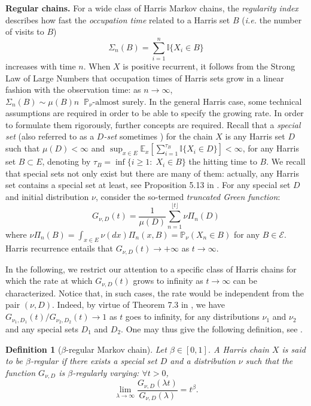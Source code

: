 \documentclass[sn-mathphys-ay]{sn-jnl}%
\newtheorem{definition}{Definition}%
\begin{document}
\noindent \textbf{Regular chains.} For a wide class of Harris Markov chains, the
\textit{regularity index} describes how fast the \textit{occupation time} related to a
Harris set $B$ (\textit{i.e.} the number of visits to $B$)
$$\Sigma_n(B)=\sum_{i=1}^n\mathbb{I}\{ X_i\in B \}$$ increases with time $n$. When $X$ is
positive recurrent, it follows from the Strong Law of Large Numbers that occupation times
of Harris sets grow in a linear fashion with the observation time: as $n\rightarrow
    \infty$, $\Sigma_n(B)\sim \mu(B)n \;\; \mathbb{P}_{\nu}\text{-almost surely}$. In the
general Harris case, some technical assumptions are required in order to be able to
specify the growing rate. In order to formulate them rigorously, further concepts are
required. Recall that a \textit{special set} (also referred to as a \textit{$D$-set}
sometimes \citep{Chen1999}) for the chain $X$ is any Harris set $D$ such that
$\mu(D)<\infty$ and $   \sup_{x\in E}\mathbb{E}_x[ \sum_{i=1}^{\tau_B}\mathbb{I}\{ X_i\in
    D \} ]<\infty$, for any Harris set $B\subset E$, denoting by $\tau_B=\inf\{i\geq 1:\;
    X_i\in B \}$ the hitting time to $B$. We recall that special sets not only exist but
there are many of them: actually, any Harris set contains a special set at least, see
Proposition 5.13 in \cite{Nummelin1984}. For any special set $D$ and initial distribution
$\nu$, consider the so-termed \textit{truncated Green function}:
\begin{equation*}
    G_{\nu,D}(t)=\frac{1}{\mu(D)}\sum_{n=1}^{\lfloor t\rfloor}\nu \Pi_n(D)
\end{equation*}
where $\nu \Pi_n(B)=\int_{x\in E}\nu(dx)\Pi_n(x,B)=\mathbb{P}_{\nu}(X_n\in B)$ for any
$B\in \mathcal{E}$. Harris recurrence entails that $G_{\nu, D}(t)\rightarrow +\infty$ as $t\rightarrow
    \infty$.

In the following, we restrict our attention to a specific class of Harris chains for
which the rate at which $G_{\nu, D}(t)$ grows to infinity as $t\rightarrow \infty$ can be
characterized. Notice that, in such cases, the rate would be independent from the pair
$(\nu, D)$. Indeed, by virtue of Theorem 7.3 in \cite{Nummelin1984}, we have $G_{\nu_1,
            D_1}(t)/G_{\nu_2, D_2}(t)\rightarrow 1$ as $t$ goes to infinity, for any distributions
$\nu_1$ and $\nu_2$ and any special sets $D_1$ and $D_2$. One may thus give the following
definition, see \cite{Chen1999,Chen2000}.

\begin{definition}[{\sc $\beta$-regular Markov chain}]\label{def:regular_chain} Let $\beta\in [0,1]$.
    A Harris chain $X$ is said to be $\beta$-regular if there exists a special
    set $D$ and a distribution $\nu$ such that the function $G_{\nu, D}$ is
    $\beta$-regularly varying: $\forall t>0$,
    \begin{equation}\label{eq:regular_chain}
        \lim_{\lambda\rightarrow \infty}\frac{G_{\nu, D}(\lambda t)}{G_{\nu, D}(\lambda)}=t^{\beta}.
    \end{equation}
\end{definition}
\end{document}
